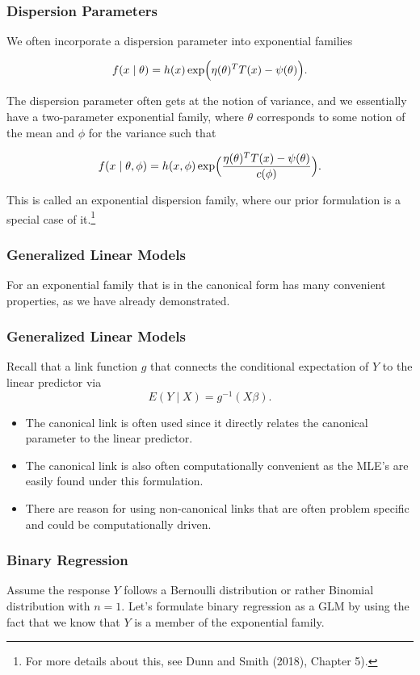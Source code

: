 \documentclass{beamer}
\begin{document}
\begin{frame}
\frametitle{Dispersion Parameters}

We often incorporate a dispersion parameter into exponential families

$$f(x \mid \theta) = h(x)\exp\Bigl(\eta(\theta)^T T(x) - \psi(\theta)\Bigr).$$

The dispersion parameter often gets at the notion of variance, and we essentially have a two-parameter exponential family, where $\theta$ corresponds to some notion of the mean and $\phi$ for the variance such that 

$$f(x \mid \theta, \phi) = h(x, \phi )\exp\Bigl(\frac{\eta(\theta)^T T(x) - \psi(\theta)}{c(\phi)}\Bigr).$$

This is called an exponential dispersion family, where our prior formulation is a special case of it.\footnote{For more details about this, see Dunn and Smith (2018), Chapter 5).}

\end{frame}

\begin{frame}
\frametitle{Generalized Linear Models}

For an exponential family that is in the canonical form has many convenient properties, as we have already demonstrated. 

\end{frame}

\begin{frame}
\frametitle{Generalized Linear Models}

Recall that a link function $g$ that connects the conditional expectation of $Y$ to the linear predictor
via
$$E(Y \mid X) = g^{-1}(X \beta).$$

\vspace*{1em}

\begin{itemize}
\item The canonical link is often used since it directly relates the canonical parameter to the linear predictor. 
\item The canonical link is also often computationally convenient as the MLE's are easily found under this formulation. 
\item There are reason for using non-canonical links that are often problem specific and could be computationally driven. 
\end{itemize} 
\end{frame}

\begin{frame}
\frametitle{Binary Regression}

Assume the response $Y$ follows a Bernoulli distribution or rather Binomial distribution with $n=1.$ Let's formulate binary regression as a GLM by using the fact that we know that $Y$ is a member of the exponential family. 

\end{frame}
\end{document}
